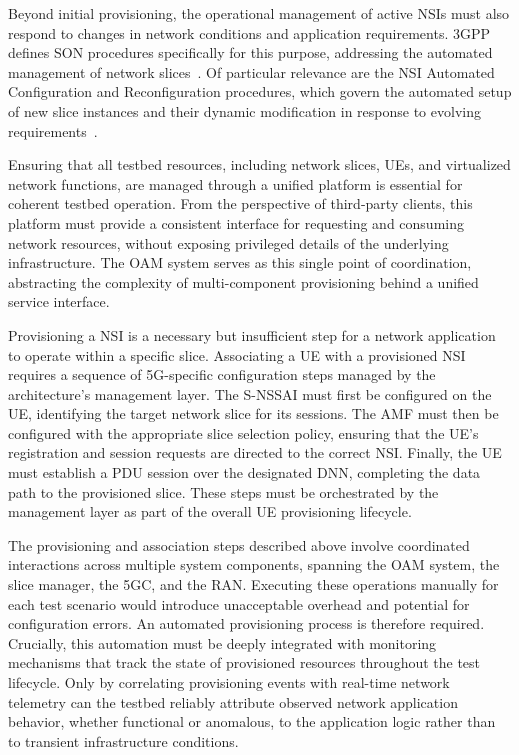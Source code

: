 
Beyond initial provisioning, the operational management of active \acsp{NSI} must also respond to changes in network conditions and application requirements. \acs{3GPP} defines \acf{SON} procedures specifically for this purpose, addressing the automated management of network slices~\cite{3GPP-28.801}. Of particular relevance are the \acs{NSI} Automated Configuration and Reconfiguration procedures, which govern the automated setup of new slice instances and their dynamic modification in response to evolving requirements~\cite{3GPP-28.801}.

Ensuring that all testbed resources, including network slices, \acsp{UE}, and virtualized network functions, are managed through a unified platform is essential for coherent testbed operation. From the perspective of third-party clients, this platform must provide a consistent interface for requesting and consuming network resources, without exposing privileged details of the underlying infrastructure. The \acs{OAM} system serves as this single point of coordination, abstracting the complexity of multi-component provisioning behind a unified service interface.



Provisioning a \acs{NSI} is a necessary but insufficient step for a network application to operate within a specific slice. Associating a \acs{UE} with a provisioned \acs{NSI} requires a sequence of \acs{5G}-specific configuration steps managed by the architecture's management layer. The \acf{S-NSSAI} must first be configured on the \acs{UE}, identifying the target network slice for its sessions. The \acs{AMF} must then be configured with the appropriate slice selection policy, ensuring that the \acs{UE}'s registration and session requests are directed to the correct \acs{NSI}. Finally, the \acs{UE} must establish a \acs{PDU} session over the designated \acf{DNN}, completing the data path to the provisioned slice. These steps must be orchestrated by the management layer as part of the overall \acs{UE} provisioning lifecycle.

The provisioning and association steps described above involve coordinated interactions across multiple system components, spanning the \acs{OAM} system, the slice manager, the \acs{5GC}, and the \acs{RAN}. Executing these operations manually for each test scenario would introduce unacceptable overhead and potential for configuration errors. An automated provisioning process is therefore required. Crucially, this automation must be deeply integrated with monitoring mechanisms that track the state of provisioned resources throughout the test lifecycle. Only by correlating provisioning events with real-time network telemetry can the testbed reliably attribute observed network application behavior, whether functional or anomalous, to the application logic rather than to transient infrastructure conditions.

